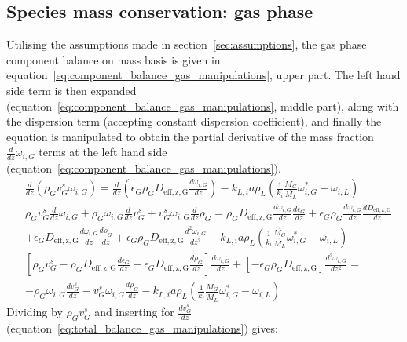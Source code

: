 \documentclass{article}
\begin{document}
\subsection{Species mass conservation: gas phase}
\label{subsec:manipulations_gas_phase_equations}
Utilising the assumptions made in section~\ref{sec:assumptions}, the gas phase component balance on mass basis is given in equation~\ref{eq:component_balance_gas_manipulations}, upper part. The left hand side term is then expanded (equation~\ref{eq:component_balance_gas_manipulations}, middle part), along with the dispersion term (accepting constant dispersion coefficient), and finally the equation is manipulated to obtain the partial derivative of the mass fraction $\frac{d}{dz}\omega_{i,G}$ terms at the left hand side (equation~\ref{eq:component_balance_gas_manipulations}). 
\begin{equation}
\begin{split}
	&\frac{d}{dz}\left(\rho_G v_G^s \omega_{i,G} \right) = \frac{d}{dz}\left(\epsilon_G \rho_G D_{\mathrm{eff,z,G}}\frac{d\omega_{i,G}}{dz} \right)- k_{L,i}a\rho_L(\frac{1}{k_i}\frac{\overline{M_G}}{\overline{M_L}}\omega_{i,G}^*-\omega_{i,L}) \\
	&\rho_G v_G^s\frac{d}{dz}\omega_{i,G} + \rho_G\omega_{i,G}\frac{d}{dz}v_G^s + v_G^s \omega_{i,G}\frac{d}{dz}\rho_G =
	\rho_G D_{\mathrm{eff,z,G}} \frac{d \omega_{i,G}}{dz}\frac{d \epsilon_G}{dz} + \epsilon_G \rho_G \frac{d \omega_{i,G}}{dz}\frac{d D_{\mathrm{eff,z,G}}}{dz} \\
	&+ \epsilon_G D_{\mathrm{eff,z,G}}\frac{d\omega_{i,G}}{dz}\frac{d \rho_G}{dz} + \epsilon_G \rho_G D_{\mathrm{eff,z,G}} \frac{d^2 \omega_{i,G}}{dz^2} - k_{L,i}a\rho_L(\frac{1}{k_i}\frac{\overline{M_G}}{\overline{M_L}}\omega_{i,G}^*-\omega_{i,L})\\
	&\left[ \rho_G v_G^s -\rho_G D_{\mathrm{eff,z,G}} \frac{d\epsilon_G}{dz} - \epsilon_GD_{\mathrm{eff,z,G}}\frac{d\rho_G}{dz}  \right]\frac{d \omega_{i,G}}{dz} + \left[-\epsilon_G\rho_G D_{\mathrm{eff,z,G}}\right]\frac{d^2\omega_{i,G}}{dz^2} = \\
	& - \rho_G \omega_{i,G} \frac{d v_G^s}{dz} - v_G^s\omega_{i,G}\frac{d\rho_G}{dz} - k_{L,i} a \rho_L\left(\frac{1}{k_i}\frac{\overline{M_G}}{\overline{M_L}}\omega_{i,G}^*-\omega_{i,L} \right)
	\end{split}
\end{equation}
Dividing by $\rho_G v_G^s$ and inserting for $\frac{d v_G^s}{dz}$ (equation~\ref{eq:total_balance_gas_manipulations}) gives:
\end{document}
